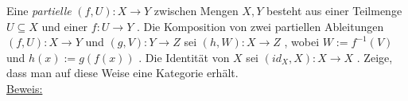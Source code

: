 
Eine \emph{partielle \Abb} 
\begin{math}
	\left( f, U \right): X \to Y 
\end{math}
zwischen Mengen 
\begin{math}
	X,Y
\end{math}
besteht aus einer Teilmenge 
\begin{math}
	U \subseteq X
\end{math}
und einer \Abb 
\begin{math}
	f: U \to Y 
\end{math}
. 
Die Komposition von zwei partiellen Ableitungen 
\begin{math}
	\left(f,U \right): X \to Y 
\end{math}
und
\begin{math}
	\left(g,V \right) :Y \to Z 
\end{math}
sei 
\begin{math}
	\left( h,W \right) : X \to Z 
\end{math}
, wobei 
\begin{math}
	W:= f^{-1} \left( V \right)
\end{math}
und 
\begin{math}
	h(x) := g \left( f(x) \right)
\end{math}
.
Die Identit\"at von 
\begin{math}
	X
\end{math}
sei 
\begin{math}
	\left( id_X , X \right) : X \to X
\end{math}
.
Zeige, dass man auf diese Weise eine Kategorie \Par erh\"alt.	
\\
\underline{Beweis:}
\\
	
\\
